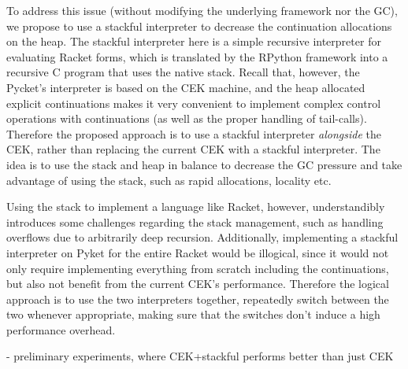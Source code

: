 To address this issue (without modifying the underlying framework nor
the GC), we propose to use a stackful interpreter to decrease the
continuation allocations on the heap. The stackful interpreter here is
a simple recursive interpreter for evaluating Racket forms, which is
translated by the RPython framework into a recursive C program that
uses the native stack. Recall that, however, the Pycket's interpreter
is based on the CEK machine, and the heap allocated explicit
continuations makes it very convenient to implement complex control
operations with continuations (as well as the proper handling of
tail-calls). Therefore the proposed approach is to use a stackful
interpreter \emph{alongside} the CEK, rather than replacing the
current CEK with a stackful interpreter. The idea is to use the stack
and heap in balance to decrease the GC pressure and take advantage of
using the stack, such as rapid allocations, locality etc.

Using the stack to implement a language like Racket, however,
understandibly introduces some challenges regarding the stack
management, such as handling overflows due to arbitrarily deep
recursion. Additionally, implementing a stackful interpreter on Pyket
for the entire Racket would be illogical, since it would not only
require implementing everything from scratch including the
continuations, but also not benefit from the current CEK's
performance. Therefore the logical approach is to use the two
interpreters together, repeatedly switch between the two whenever
appropriate, making sure that the switches don't induce a high
performance overhead.




- preliminary experiments, where CEK+stackful performs better than
just CEK
